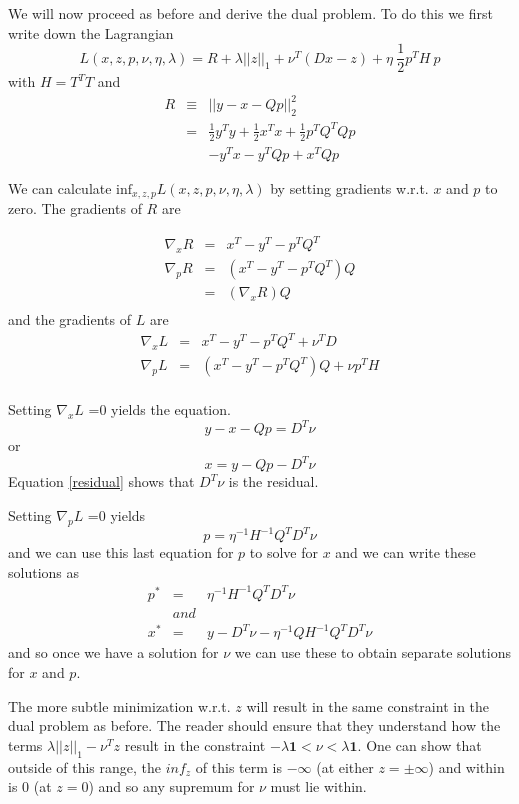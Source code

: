 \documentclass{article}
\begin{document}
We will now proceed as before and derive the dual problem. To do this we first
write down the Lagrangian
\[
L(x,z,p,\nu,\eta,\lambda) =  R  + \lambda ||z||_1 + \nu^T (D x -z) + \eta ~ \frac{1}{2} p^T H ~p
\]
with  $H = T^T T$ and
\begin{eqnarray}
R & \equiv & || y - x - Q p||_2^2 \\
& = & \frac{1}{2} y^T y + \frac{1}{2} x^T x + \frac{1}{2} p^T Q^T Q p \\
&  & - y^T x - y^T Q p + x^T Q p
\end{eqnarray}

We can calculate $\mbox{inf}_{x,z,p} L(x,z,p,\nu,\eta,\lambda)$ by setting gradients w.r.t. $x$ and $p$ to zero. The
gradients of $R$ are

\begin{eqnarray}
\nabla_x R &  =  &  x^T - y^T - p^T Q^T\\
\nabla_p R &  =  &  \left( x^T - y^T - p^T Q^T \right) Q \\
& = & \left(\nabla_x R \right) Q \\
\end{eqnarray}
and the gradients of $L$ are
\begin{eqnarray}
\nabla_x L &  =  &  x^T - y^T - p^T Q^T + \nu^T D\\
\nabla_p L &  =  &  \left( x^T - y^T - p^T Q^T \right) Q + \nu p^T H \\
\end{eqnarray}


Setting $\nabla_x L$ =0 yields the equation.
\[
y - x - Qp = D^T \nu \label{residual}
\] or
\[
x = y - Qp - D^T \nu
\]
Equation \ref{residual} shows that $D^T \nu$ is the residual.

Setting $\nabla_p L$ =0 yields
\[
p = \eta^{-1} H^{-1} Q^T D^T \nu
\]
and we can use this last equation for $p$ to solve for $x$ and we can write these solutions as
\begin{eqnarray}
p^* & = &  \eta^{-1} H^{-1} Q^T D^T \nu \\
& and & \nonumber \\
x^* & = & y - D^T \nu - \eta^{-1} Q H^{-1} Q^T D^T \nu
\end{eqnarray}
and so once we have a solution for $\nu$ we can use these to obtain separate
solutions for $x$ and $p$.

The more subtle minimization w.r.t. $z$ will result in the same constraint in the dual problem as before. The reader
should ensure that they understand how the terms $\lambda ||z||_1 - \nu^T z$ result in the constraint
$- \lambda \mathbf{1} < \nu < \lambda \mathbf{1}$. One can show that outside of this range, the $inf_z$ of this term
is $-\infty$ (at either $z = \pm \infty$) and within is 0 (at $z=0$) and so any supremum for $\nu$
must lie within.
\end{document}
